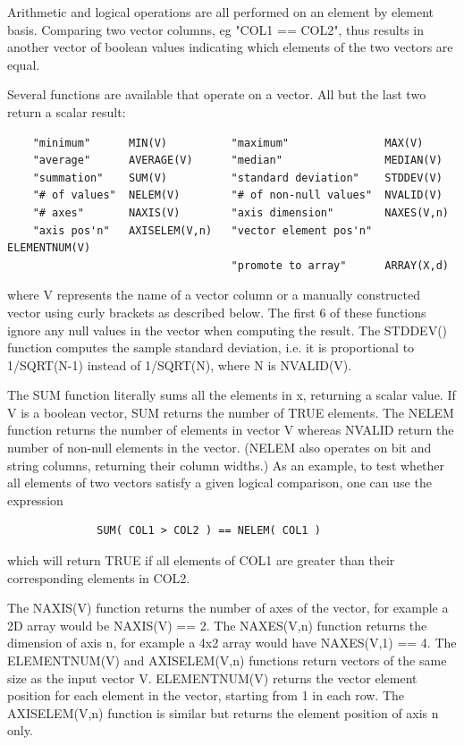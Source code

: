 \documentclass[11pt]{book}
\begin{document}
    Arithmetic and logical operations are all performed on an element by
    element basis.  Comparing two vector columns,  eg  "COL1  ==  COL2",
    thus  results  in  another vector of boolean values indicating which
    elements of the two vectors are equal.

    Several functions are available that operate on a vector.  All but
    the last two return a scalar result:

\begin{verbatim}
    "minimum"      MIN(V)          "maximum"               MAX(V)
    "average"      AVERAGE(V)      "median"                MEDIAN(V)
    "summation"    SUM(V)          "standard deviation"    STDDEV(V)
    "# of values"  NELEM(V)        "# of non-null values"  NVALID(V)
    "# axes"       NAXIS(V)        "axis dimension"        NAXES(V,n)
    "axis pos'n"   AXISELEM(V,n)   "vector element pos'n"  ELEMENTNUM(V)
                                   "promote to array"      ARRAY(X,d)
\end{verbatim}
    where V represents the name of a vector column or a manually
    constructed vector using curly brackets as described below.  The
    first 6 of these functions ignore any null values in the vector when
    computing the result.  The STDDEV() function computes the sample
    standard deviation, i.e. it is proportional to 1/SQRT(N-1) instead
    of 1/SQRT(N), where N is NVALID(V).

    The SUM function literally sums all  the elements in x,  returning a
    scalar value.   If V  is  a  boolean  vector, SUM returns the number
    of TRUE elements. The NELEM function  returns the number of elements
    in vector V whereas NVALID return the number of non-null elements in
    the  vector.   (NELEM  also  operates  on  bit  and string  columns,
    returning their column widths.)  As an example, to  test whether all
    elements of two vectors satisfy a  given logical comparison, one can
    use the expression

\begin{verbatim}
              SUM( COL1 > COL2 ) == NELEM( COL1 )
\end{verbatim}

    which will return TRUE if all elements  of  COL1  are  greater  than
    their corresponding elements in COL2.

    The NAXIS(V) function returns the number of axes of the vector,
    for example a 2D array would be NAXIS(V) == 2.  The NAXES(V,n)
    function returns the dimension of axis n, for example a 4x2 array
    would have NAXES(V,1) == 4.  The ELEMENTNUM(V) and AXISELEM(V,n)
    functions return vectors of the same size as the input vector V.
    ELEMENTNUM(V) returns the vector element position for each element
    in the vector, starting from 1 in each row.  The AXISELEM(V,n)
    function is similar but returns the element position of axis n
    only.
\end{document}
